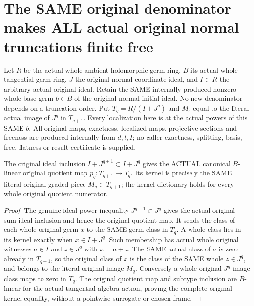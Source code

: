 \section{The SAME original denominator makes ALL actual original normal truncations finite free}
Let $R$ be the actual whole ambient holomorphic germ ring, $B$ its actual
whole tangential germ ring, $J$ the original normal-coordinate ideal, and
$I\subset R$ the arbitrary actual original ideal. Retain the SAME internally
produced nonzero whole base germ $b\in B$ of the original normal initial
ideal. No new denominator depends on a truncation order. Put
$T_q=R/(I+J^q)$ and $M_q$ equal to the literal actual image of $J^q$ in
$T_{q+1}$. Every localization here is at the actual powers of this SAME $b$.
All original maps, exactness, localized maps, projective sections and freeness
are produced internally from $d,t,I$; no caller exactness, splitting, basis,
free, flatness or result certificate is supplied.

\begin{theorem}
\label{hir:relative-normal-uniformtrunc-actual-kernel}
\leanok
{}
The original ideal inclusion $I+J^{q+1}\subset I+J^q$ gives the ACTUAL
canonical $B$-linear original quotient map $p_q:T_{q+1}\to T_q$. Its kernel
is precisely the SAME literal original graded piece $M_q\subset T_{q+1}$;
the kernel dictionary holds for every whole original quotient numerator.
\end{theorem}
\begin{proof}
The genuine ideal-power inequality $J^{q+1}\subset J^q$ gives the actual
original sum-ideal inclusion and hence the original quotient map. It sends
the class of each whole original germ $x$ to the SAME germ class in $T_q$.
A whole class lies in its kernel exactly when $x\in I+J^q$. Such membership
has actual whole original witnesses $a\in I$ and $z\in J^q$ with $x=a+z$.
The SAME actual class of $a$ is zero already in $T_{q+1}$, so the original
class of $x$ is the class of the SAME whole $z\in J^q$, and belongs to the
literal original image $M_q$. Conversely a whole original $J^q$ image class
maps to zero in $T_q$. The original quotient map and subtype inclusion are
$B$-linear for the actual tangential algebra action, proving the complete
original kernel equality, without a pointwise surrogate or chosen frame.
\end{proof}


